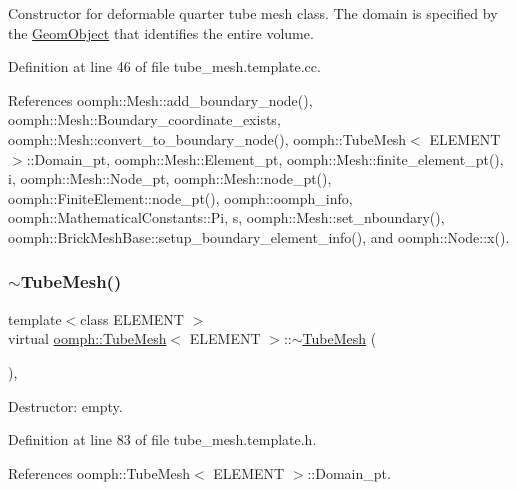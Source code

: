 Constructor for deformable quarter tube mesh class. The domain is specified by the \hyperlink{classoomph_1_1GeomObject}{Geom\+Object} that identifies the entire volume. 

Definition at line 46 of file tube\+\_\+mesh.\+template.\+cc.



References oomph\+::\+Mesh\+::add\+\_\+boundary\+\_\+node(), oomph\+::\+Mesh\+::\+Boundary\+\_\+coordinate\+\_\+exists, oomph\+::\+Mesh\+::convert\+\_\+to\+\_\+boundary\+\_\+node(), oomph\+::\+Tube\+Mesh$<$ E\+L\+E\+M\+E\+N\+T $>$\+::\+Domain\+\_\+pt, oomph\+::\+Mesh\+::\+Element\+\_\+pt, oomph\+::\+Mesh\+::finite\+\_\+element\+\_\+pt(), i, oomph\+::\+Mesh\+::\+Node\+\_\+pt, oomph\+::\+Mesh\+::node\+\_\+pt(), oomph\+::\+Finite\+Element\+::node\+\_\+pt(), oomph\+::oomph\+\_\+info, oomph\+::\+Mathematical\+Constants\+::\+Pi, s, oomph\+::\+Mesh\+::set\+\_\+nboundary(), oomph\+::\+Brick\+Mesh\+Base\+::setup\+\_\+boundary\+\_\+element\+\_\+info(), and oomph\+::\+Node\+::x().

\mbox{\label{classoomph_1_1TubeMesh_af77e5d5022c77c3bf7340387258b2d51}} 
\subsubsection{\texorpdfstring{$\sim$\+Tube\+Mesh()}{~TubeMesh()}}
{\footnotesize\ttfamily template$<$class E\+L\+E\+M\+E\+NT $>$ \\
virtual \hyperlink{classoomph_1_1TubeMesh}{oomph\+::\+Tube\+Mesh}$<$ E\+L\+E\+M\+E\+NT $>$\+::$\sim$\hyperlink{classoomph_1_1TubeMesh}{Tube\+Mesh} (\begin{DoxyParamCaption}{ }\end{DoxyParamCaption})\hspace{0.3cm}{\ttfamily [inline]}, {\ttfamily [virtual]}}



Destructor\+: empty. 



Definition at line 83 of file tube\+\_\+mesh.\+template.\+h.



References oomph\+::\+Tube\+Mesh$<$ E\+L\+E\+M\+E\+N\+T $>$\+::\+Domain\+\_\+pt.



